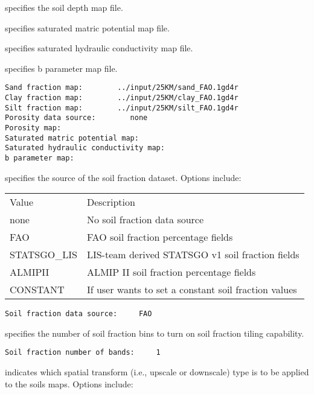   specifies the soil depth map file.

  specifies saturated matric
 potential map file.

  specifies saturated
 hydraulic conductivity map file.

  specifies b parameter map file.

 

 \begin{Verbatim}[frame=single]
Sand fraction map:        ../input/25KM/sand_FAO.1gd4r
Clay fraction map:        ../input/25KM/clay_FAO.1gd4r
Silt fraction map:        ../input/25KM/silt_FAO.1gd4r
Porosity data source:        none
Porosity map:                  
Saturated matric potential map:       
Saturated hydraulic conductivity map: 
b parameter map:                      
 \end{Verbatim}

 
  specifies the source
  of the soil fraction dataset.
  Options include:

 \begin{tabular}{ll}
 Value   & Description                         \\
 none    & No soil fraction data source        \\
 FAO     & FAO soil fraction percentage fields \\
 STATSGO\_LIS & LIS-team derived STATSGO v1 soil fraction fields \\
 ALMIPII  & ALMIP II soil fraction percentage fields \\
 CONSTANT & If user wants to set a constant soil fraction values \\
 \end{tabular}
 

 \begin{Verbatim}[frame=single]
Soil fraction data source:     FAO
 \end{Verbatim}

 
  specifies the number of
 soil fraction bins to turn on soil fraction tiling capability.

 

 \begin{Verbatim}[frame=single]
Soil fraction number of bands:     1
 \end{Verbatim}

 
  indicates which spatial transform
 (i.e., upscale or downscale) type is to be applied to the soils
 maps.  Options include:

